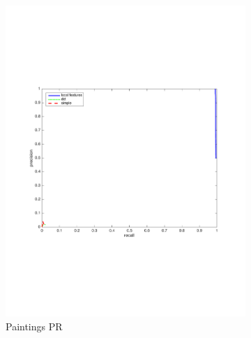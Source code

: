 \documentclass[english,12pt,a4paper,pdftex,elec,utf8, table]{aaltothesis}
\begin{document}
\begin{figure}[htb]
\begin{center}
\begin{subfigure}[b]{0.49\textwidth}
    \includegraphics[width=\textwidth]{figures/Rotate10PR.pdf}
    \caption{Paintings PR}
    \label{Rotaterocthinglink}
  \end{subfigure}
  \begin{subfigure}[b]{0.49\textwidth}

\end{subfigure}
\end{center}
\end{figure}
\end{document}

